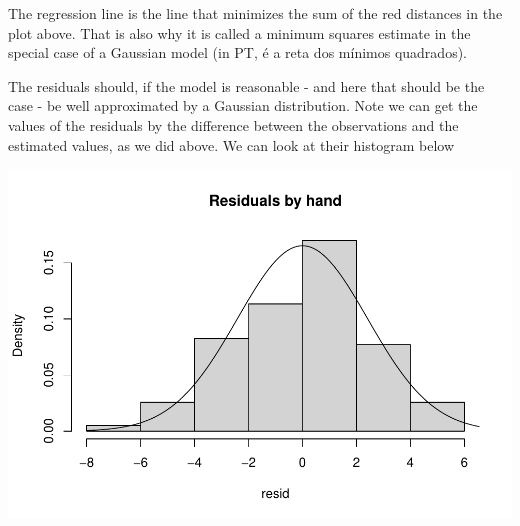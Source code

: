 \documentclass[
]{book}
\newenvironment{Shaded}{\begin{snugshade}}{\end{snugshade}}
\newcommand{\AttributeTok}[1]{\textcolor[rgb]{0.77,0.63,0.00}{#1}}
\newcommand{\CommentTok}[1]{\textcolor[rgb]{0.56,0.35,0.01}{\textit{#1}}}
\newcommand{\ConstantTok}[1]{\textcolor[rgb]{0.00,0.00,0.00}{#1}}
\newcommand{\DecValTok}[1]{\textcolor[rgb]{0.00,0.00,0.81}{#1}}
\newcommand{\FloatTok}[1]{\textcolor[rgb]{0.00,0.00,0.81}{#1}}
\newcommand{\FunctionTok}[1]{\textcolor[rgb]{0.00,0.00,0.00}{#1}}
\newcommand{\NormalTok}[1]{#1}
\newcommand{\SpecialCharTok}[1]{\textcolor[rgb]{0.00,0.00,0.00}{#1}}
\newcommand{\StringTok}[1]{\textcolor[rgb]{0.31,0.60,0.02}{#1}}
\begin{document}
The regression line is the line that minimizes the sum of the red distances in the plot above. That is also why it is called a minimum squares estimate in the special case of a Gaussian model (in PT, é a reta dos mínimos quadrados).

The residuals should, if the model is reasonable - and here that should be the case - be well approximated by a Gaussian distribution. Note we can get the values of the residuals by the difference between the observations and the estimated values, as we did above. We can look at their histogram below

\begin{Shaded}
\end{Shaded}

\includegraphics{ECOMODbook_files/figure-latex/a6.12-1.pdf}
\end{document}
